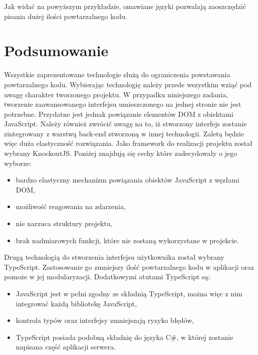 Jak widać na powyższym przykładzie, omawiane języki pozwalają zaoszczędzić pisania dużej ilości powtarzalnego kodu.


\section{Podsumowanie}
Wszystkie zaprezentowane technologie służą do ograniczenia powstawania powtarzalnego kodu. Wybierając technologię należy przede wszystkim wziąć pod uwagę charakter tworzonego projektu. W przypadku niniejszego zadania, tworzenie zaawansowanego interfejsu umieszczonego na jednej stronie nie jest potrzebne. Przydatne jest jednak powiązanie elementów DOM z obiektami JavaScript. Należy również zwrócić uwagę na to, iż stworzony interfejs zostanie zintegrowany z warstwą back-end stworzoną w innej technologii. Zaletą będzie więc duża elastyczność rozwiązania. Jako framework do realizacji projektu został wybrany KnockoutJS. Poniżej znajdują się cechy które zadecydowały o jego wyborze:
\begin{itemize}
\item bardzo elastyczny mechanizm powiązania obiektów JavaScript z węzłami DOM,
\item możliwość reagowania na zdarzenia,
\item nie narzuca struktury projektu,
\item brak nadmiarowych funkcji, które nie zostaną wykorzystane w projekcie.
\end{itemize}

Drugą technologią do stworzenia interfejsu użytkownika został wybrany TypeScript. Zastosowanie go zmniejszy ilość powtarzalnego kodu w aplikacji oraz pomoże w jej modularyzacji. Dodatkowymi atutami TypeScript są:
\begin{itemize}
\item JavaScript jest w pełni zgodny ze składnią TypeScript, można więc z nim integrować każdą bibliotekę JavaScript,
\item kontrola typów oraz interfejsy zmniejszają ryzyko błędów,
\item TypeScript posiada podobną składnię do języka C\#, w której zostanie napisana część aplikacji serwera.
\end{itemize}

